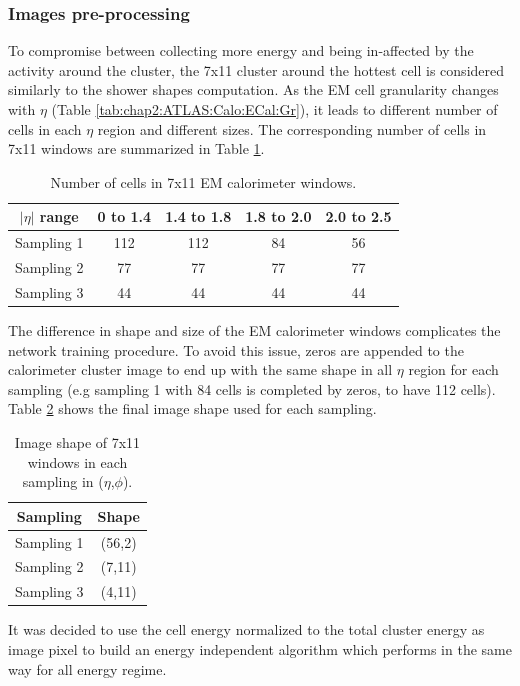 \subsubsection{Images pre-processing}
\label{gamma:CNN:PreProcessing}
To compromise between collecting more energy and being in-affected by the activity around the cluster, the 7x11 cluster around the hottest cell is considered similarly to the shower shapes computation. As the EM cell granularity changes with $\eta$ (Table \ref{tab:chap2:ATLAS:Calo:ECal:Gr}), it leads to different number of cells in each $\eta$ region and different sizes. The corresponding number of cells in 7x11 windows are summarized in Table \ref{tab:gamma:CNN:PreProcessing:NCells}.
\begin{table}[H]
    \centering
    \begin{tabular}{ccccc}
    \hline
        $|\eta|$ range & 0 to 1.4 & 1.4 to 1.8 & 1.8 to 2.0 & 2.0 to 2.5 \\
    \hline
        Sampling 1 & 112 & 112 & 84 & 56 \\
        Sampling 2 & 77 & 77 & 77 & 77 \\
        Sampling 3 & 44 & 44 & 44 & 44 \\
    \hline
    \end{tabular}
    \caption{Number of cells in 7x11 EM calorimeter windows.}
    \label{tab:gamma:CNN:PreProcessing:NCells}
\end{table}
The difference in shape and size of the EM calorimeter windows complicates the network training procedure. To avoid this issue, zeros are appended to the calorimeter cluster image to end up with the same shape in all $\eta$ region for each sampling (e.g sampling 1 with 84 cells is completed by zeros, to have 112 cells). Table \ref{tab:gamma:CNN:PreProcessing:ImgSize} shows the final image shape used for each sampling.
\begin{table}[H]
    \centering
    \begin{tabular}{cc}
    \hline
        Sampling & Shape \\
    \hline
        Sampling 1 & (56,2)\\
        Sampling 2 & (7,11)  \\
        Sampling 3 & (4,11) \\
    \hline
    \end{tabular}
    \caption{Image shape of 7x11 windows in each sampling in ($\eta$,$\phi$).}
    \label{tab:gamma:CNN:PreProcessing:ImgSize}
\end{table}
It was decided to use the cell energy normalized to the total cluster energy as image pixel to build an energy independent algorithm which performs in the same way for all energy regime.
